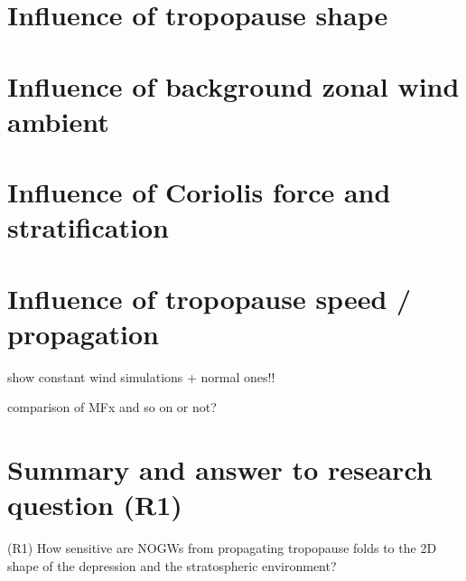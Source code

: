 \section{Influence of tropopause shape}

\section{Influence of background zonal wind ambient}

\section{Influence of Coriolis force and stratification}

\section{Influence of tropopause speed / propagation}

show constant wind simulations + normal ones!!

comparison of MFx and so on or not?

\section{Summary and answer to research question (R1)}

\begin{tcolorbox}[]
    (R1) How sensitive are NOGWs from propagating tropopause folds to the 2D shape of the depression and the stratospheric environment?
\end{tcolorbox}